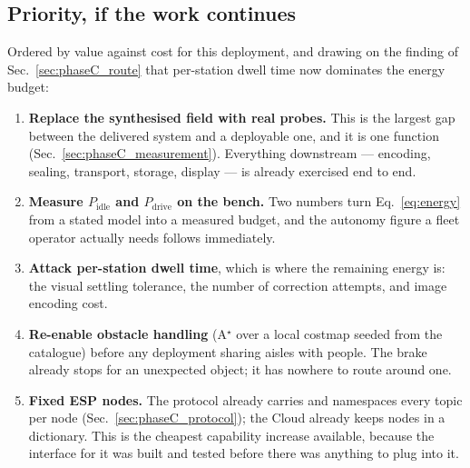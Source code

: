\subsection{Priority, if the work continues}

Ordered by value against cost for this deployment, and drawing on the
finding of Sec.~\ref{sec:phaseC_route} that per-station dwell time now
dominates the energy budget:

\begin{enumerate}[leftmargin=*,itemsep=2pt,topsep=3pt]
  \item \textbf{Replace the synthesised field with real probes.} This is
        the largest gap between the delivered system and a deployable
        one, and it is one function
        (Sec.~\ref{sec:phaseC_measurement}). Everything downstream ---
        encoding, sealing, transport, storage, display --- is already
        exercised end to end.
  \item \textbf{Measure $P_{\text{idle}}$ and $P_{\text{drive}}$ on the
        bench.} Two numbers turn Eq.~\ref{eq:energy} from a stated model
        into a measured budget, and the autonomy figure a fleet operator
        actually needs follows immediately.
  \item \textbf{Attack per-station dwell time}, which is where the
        remaining energy is: the visual settling tolerance, the number of
        correction attempts, and image encoding cost.
  \item \textbf{Re-enable obstacle handling} (A$^\star$ over a local
        costmap seeded from the catalogue) before any deployment sharing
        aisles with people. The brake already stops for an unexpected
        object; it has nowhere to route around one.
  \item \textbf{Fixed ESP nodes.} The protocol already carries
         and namespaces every topic per node
        (Sec.~\ref{sec:phaseC_protocol}); the Cloud already keeps nodes
        in a dictionary. This is the cheapest capability increase
        available, because the interface for it was built and tested
        before there was anything to plug into it.
\end{enumerate}
